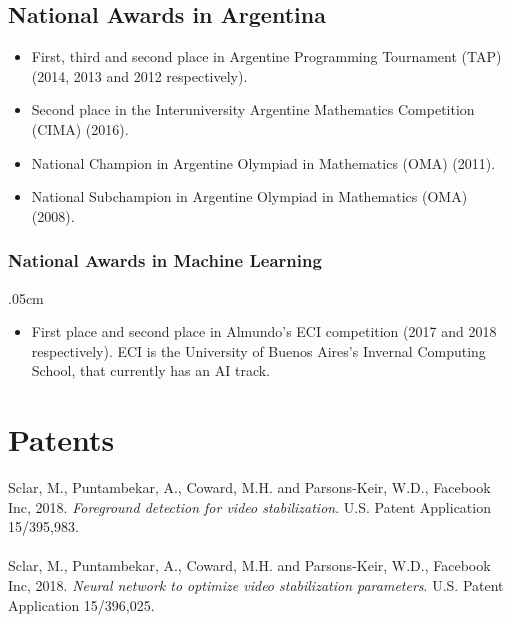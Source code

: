 \documentclass [a4paper, 11pt]{article}
\begin{document}
\subsection* {National Awards in Argentina}

{\small
\begin{itemize} \itemsep.0cm
    \item[] First, third and second place in Argentine Programming Tournament (TAP) (2014, 2013 and 2012 respectively).
    \item[] Second place in the Interuniversity Argentine Mathematics Competition (CIMA) (2016).
	\item[] National Champion in Argentine Olympiad in Mathematics (OMA) (2011).
	\item[] National Subchampion in Argentine Olympiad in Mathematics (OMA) (2008).
\end{itemize}
}
\subsubsection* {National Awards in Machine Learning} \itemsep.05cm
{\small
\begin{itemize}
\item[] First place and second place in Almundo's ECI competition (2017 and 2018 respectively). ECI is the University of Buenos Aires's Invernal Computing School, that currently has an AI track.
\end{itemize}
}
\section* {Patents}


Sclar, M., Puntambekar, A., Coward, M.H. and Parsons-Keir, W.D., Facebook Inc, 2018. \textit{Foreground detection for video stabilization}. U.S. Patent Application 15/395,983. \\\\
Sclar, M., Puntambekar, A., Coward, M.H. and Parsons-Keir, W.D., Facebook Inc, 2018. \textit{Neural network to optimize video stabilization parameters}. U.S. Patent Application 15/396,025.
\end{document}
